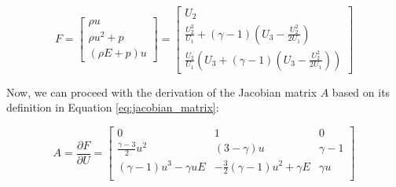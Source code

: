 \begin{equation}
    F = \begin{bmatrix}
        \rho u       \\
        \rho u^2 + p \\
        (\rho E + p) u
    \end{bmatrix} = \begin{bmatrix}
        U_2                                                                       \\
        \frac{U_2^2}{U_1} + (\gamma - 1) \left( U_3 - \frac{U_2^2}{2 U_1} \right) \\
        \frac{U_2}{U_1} \left( U_3 + (\gamma - 1) \left( U_3 - \frac{U_2^2}{2 U_1} \right) \right)
    \end{bmatrix}
\end{equation}

Now, we can proceed with the derivation of the Jacobian matrix $A$ based on its definition in Equation \ref{eq:jacobian_matrix}:

\begin{equation}
    A = \frac{\partial F}{\partial U} = \begin{bmatrix}
        0                             & 1                                        & 0          \\
        \frac{\gamma - 3}{2} u^2      & (3 - \gamma) u                           & \gamma - 1 \\
        (\gamma - 1) u^3 - \gamma u E & -\frac{3}{2} (\gamma - 1) u^2 + \gamma E & \gamma u   \\
    \end{bmatrix}
\end{equation}

